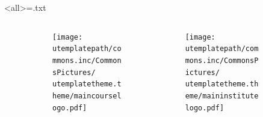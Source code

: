 \institute[\uinstituteshort]{{\uinstitute \\ \uchaire}}


\date[\uversion]{\tiny{Publication \INFODistrib ~du \\ \DTMnow}}



%
%





\mode<all>{\immediate\openout\audioexport=\jobname.txt}

\begin{frame}[plain]
 					\begin{figure}
  					 \centering
  					 \begin{columns}[c]
  \begin{column}{0.4\textwidth}
  
    \begin{figure}
        \begin{flushleft}
  			\texttt{[image: \\utemplatepath/commons.inc/CommonsPictures/\\utemplatetheme.theme/maincourselogo.pdf]}
  \end{flushleft}
  \end{figure}
      \end{column}
  
  \begin{column}{0.6\textwidth}
    \begin{figure}
        \begin{flushright}
 		    \texttt{[image: \\utemplatepath/commons.inc/CommonsPictures/\\utemplatetheme.theme/maininstitutelogo.pdf]}
    \end{flushright}
  \end{figure}
  \end{column}
\end{columns}
   							  
   							  \end{figure}
							
				  				\titlepage
\end{frame}



